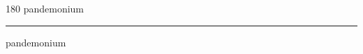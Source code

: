 
\begin{frame}
\begin{center}
\begin{turn}{180}
{\fontsize{2.5cm}{1em}\selectfont pandemonium}
\end{turn}
\vspace{1em}\par  
\hrule
\vspace{1em}\par  
{\fontsize{2.5cm}{1em}\selectfont pandemonium}
\end{center}
\end{frame}
